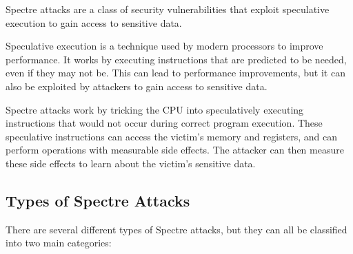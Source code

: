 \documentclass[twocolumn,showpacs,%
  nofootinbib,aps,superscriptaddress,%
  eqsecnum,prd,notitlepage,showkeys,10pt]{revtex4-1}
\begin{document}
Spectre attacks are a class of security vulnerabilities that exploit speculative execution to gain access to sensitive data.

Speculative execution is a technique used by modern processors to improve performance. It works by executing instructions that are predicted to be needed, even if they may not be. This can lead to performance improvements, but it can also be exploited by attackers to gain access to sensitive data.

Spectre attacks work by tricking the CPU into speculatively executing instructions that would not occur during correct program execution. These speculative instructions can access the victim's memory and registers, and can perform operations with measurable side effects. The attacker can then measure these side effects to learn about the victim's sensitive data.

\subsection{Types of Spectre Attacks}

There are several different types of Spectre attacks, but they can all be classified into two main categories\cite{kocher2020spectre}:
\end{document}
